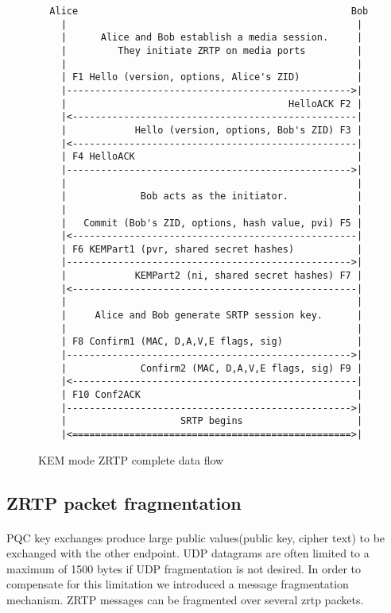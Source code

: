 \documentclass[a4paper,11pt]{article}
\begin{document}
\begin{figure}
  \begin{verbatim}
  Alice                                                Bob
    |                                                   |
    |      Alice and Bob establish a media session.     |
    |         They initiate ZRTP on media ports         |
    |                                                   |
    | F1 Hello (version, options, Alice's ZID)          |
    |-------------------------------------------------->|
    |                                       HelloACK F2 |
    |<--------------------------------------------------|
    |            Hello (version, options, Bob's ZID) F3 |
    |<--------------------------------------------------|
    | F4 HelloACK                                       |
    |-------------------------------------------------->|
    |                                                   |
    |             Bob acts as the initiator.            |
    |                                                   |
    |   Commit (Bob's ZID, options, hash value, pvi) F5 |
    |<--------------------------------------------------|
    | F6 KEMPart1 (pvr, shared secret hashes)           |
    |-------------------------------------------------->|
    |            KEMPart2 (ni, shared secret hashes) F7 |
    |<--------------------------------------------------|
    |                                                   |
    |     Alice and Bob generate SRTP session key.      |
    |                                                   |
    | F8 Confirm1 (MAC, D,A,V,E flags, sig)             |
    |-------------------------------------------------->|
    |             Confirm2 (MAC, D,A,V,E flags, sig) F9 |
    |<--------------------------------------------------|
    | F10 Conf2ACK                                      |
    |-------------------------------------------------->|
    |                    SRTP begins                    |
    |<=================================================>|
  \end{verbatim}
  \caption{KEM mode ZRTP complete data flow}
  \label{fig:KEMmode}
\end{figure}
\FloatBarrier

\subsection{ZRTP packet fragmentation}
\paragraph*{}PQC key exchanges produce large public values(public key, cipher text) to be exchanged with the other endpoint. UDP datagrams are often limited to a maximum of 1500 bytes if UDP fragmentation is not desired. In order to compensate for this limitation we introduced a message fragmentation mechanism. ZRTP messages can be fragmented over several zrtp packets.
\end{document}
